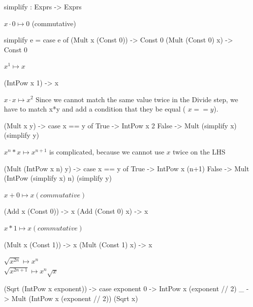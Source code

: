 \documentclass[12pt]{amsbook}
\begin{document}
\begin{code}
simplify : Exprs -> Exprs
\end{code}
$x \cdot 0 \mapsto 0$  (commutative)
\vspace{-12pt}
\begin{code}
simplify e = case e of
               (Mult x (Const 0)) -> Const 0
               (Mult (Const 0) x) -> Const 0
\end{code}
$x^1 \mapsto x$
\vspace{-12pt}
\begin{code}
               (IntPow x 1) -> x
\end{code}
$x\cdot x \mapsto x^2$
Since we cannot match the same value twice in the Divide step,
we have to match x*y and add a condition that they be equal ( $x == y$).
\vspace{-12pt}
\begin{code}
               (Mult x y) -> case x == y of
                               True  -> IntPow x 2
                               False -> Mult (simplify x) (simplify y)
\end{code}
$x^n * x \mapsto x^{n+1}$
is complicated, because we cannot use $x$ twice on the LHS
\vspace{-12pt}
\begin{code}
               (Mult (IntPow x n) y)
                               -> case x == y of
                                    True -> IntPow x (n+1)
                                    False -> Mult (IntPow (simplify x) n) (simplify y)
\end{code}
$x + 0 \mapsto x  (commutative)$
\vspace{-12pt}
\begin{code}
               (Add x (Const 0)) -> x
               (Add (Const 0) x) -> x
\end{code}
$x * 1 \mapsto x  (commutative)$
\vspace{-12pt}
\begin{code}
               (Mult x (Const 1)) -> x
               (Mult (Const 1) x) -> x
\end{code}
$\sqrt{x^{2n}} \mapsto x^n$ \\
$\sqrt{x^{2n+1}} \mapsto x^n\sqrt x$ 
\vspace{-12pt}
\begin{code}
               (Sqrt  (IntPow x exponent))
                  -> case exponent %
                       0 -> IntPow x (exponent // 2)
                       _ -> Mult (IntPow x (exponent // 2)) (Sqrt x)
\end{code}
\end{document}
